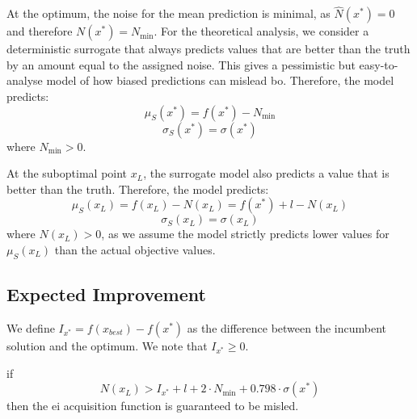 At the optimum, the noise for the mean prediction is minimal, as $\hat{N}(x^*)=0$ and therefore $N(x^*)=N_\text{min}$. For the theoretical analysis, we consider a deterministic surrogate that always predicts values that are better than the truth by an amount equal to the assigned noise. This gives a pessimistic but easy-to-analyse model of how biased predictions can mislead \gls{bo}. Therefore, the model predicts:
\begin{equation*}
    \mu_S(x^*) = f(x^*) - N_{\min}
\end{equation*}
\begin{equation*}
    \sigma_S(x^*) = \sigma(x^*)
\end{equation*}
where $N_{\min} > 0$.

At the suboptimal point $x_L$, the surrogate model also predicts a value that is better than the truth. Therefore, the model predicts:
\begin{equation*}
    \mu_S(x_L) = f(x_L) - N(x_L) = f(x^*) + l - N(x_L)
\end{equation*}
\begin{equation*}
    \sigma_S(x_L) = \sigma(x_L)
\end{equation*}
where $N(x_L) > 0$, as we assume the model strictly predicts lower values for $\mu_S(x_L)$ than the actual objective values.

\subsection{Expected Improvement}
We define $I_{x^*} = f(x_{best}) - f(x^*)$ as the difference between the incumbent solution and the optimum. We note that $I_{x^*} \ge 0$.

\begin{theorem}
if
\begin{equation*}
    N(x_L) > I_{x^*} + l + 2 \cdot N_{\min} + 0.798 \cdot \sigma(x^*)
\end{equation*}
then the \gls{ei} acquisition function is guaranteed to be misled.
\end{theorem}

